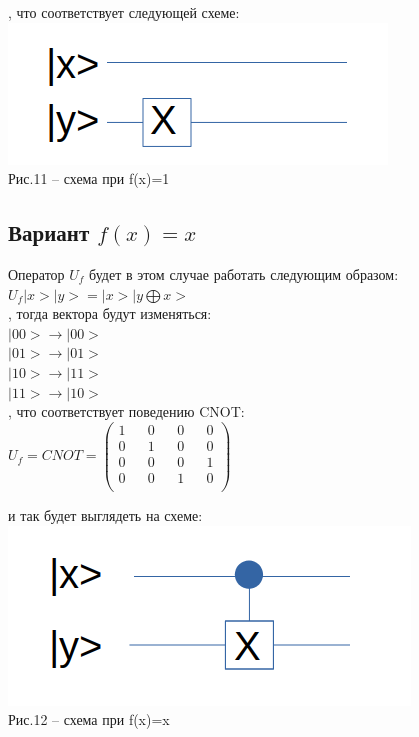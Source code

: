 \documentclass[11pt]{report}
\begin{document}
, что соответствует следующей схеме: \\

\includegraphics[scale=0.3]{f_1}\\
Рис.11 -- схема при f(x)=1\\

\subsection{Вариант $f(x)=x$}
Оператор $U_f$ будет в этом случае работать следующим образом: \\

$U_f|x>|y>=|x>|y \bigoplus x> $ \\

, тогда вектора будут изменяться: \\

$|00> \rightarrow |00> $ \\

$|01> \rightarrow |01> $ \\

$|10> \rightarrow |11> $ \\

$|11> \rightarrow |10> $ \\

, что соответствует поведению CNOT:\\

$U_f = CNOT = \begin{pmatrix}
1 && 0 && 0 && 0 \\
0 && 1 && 0 && 0 \\
0 && 0 && 0 && 1 \\
0 && 0 && 1 && 0 \\
\end{pmatrix}$

и так будет выглядеть на схеме:\\

\includegraphics[scale=0.3]{f_x} \\
Рис.12 -- схема при f(x)=x\\
\end{document}

